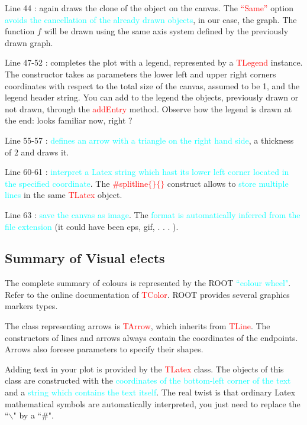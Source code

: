 \documentclass[12pt,a4paper]{article}
\begin{document}
Line 44 : again draws the clone of the object on the canvas. The \textcolor{red}{``Same”} option \textcolor{cyan}{avoids the cancellation of the already drawn objects}, in our case, the graph. The function $f$ will be drawn using the same axis system defined by the previously drawn graph.

Line 47-52 : completes the plot with a legend, represented by a \textcolor{red}{TLegend} instance. The constructor takes as parameters the lower left and upper right corners coordinates with respect to the total size of the canvas, assumed to be 1, and the legend header string. You can add to the legend the objects, previously drawn or not drawn, through the \textcolor{red}{addEntry} method. Observe how the legend is drawn at the end: looks familiar now, right ?

Line 55-57 : \textcolor{cyan}{defines an arrow with a triangle on the right hand side}, a thickness of $2$ and draws it.

Line 60-61 : \textcolor{cyan}{interpret a Latex string which hast its lower left corner located in the specified coordinate}. The \textcolor{red}{$\#$splitline$\{\}\{\}$} construct allows to \textcolor{cyan}{store multiple lines} in the same \textcolor{red}{TLatex} object.

Line 63 : \textcolor{cyan}{save the canvas as image}. The \textcolor{cyan}{format is automatically inferred from the file extension} (it could have been eps, gif, . . . ).


\subsection{Summary of Visual e!ects}
The complete summary of colours is represented by the ROOT \textcolor{cyan}{``colour wheel"}. Refer to the online documentation of \textcolor{red}{TColor}. ROOT provides several graphics markers types.

The class representing arrows is \textcolor{red}{TArrow}, which inherits from \textcolor{red}{TLine}. The constructors of lines and arrows always contain the coordinates of the endpoints. Arrows also foresee parameters to specify their shapes.

Adding text in your plot is provided by the \textcolor{red}{TLatex} class. The objects of this class are constructed with the \textcolor{cyan}{coordinates of the bottom-left corner of the text} and a \textcolor{cyan}{string which contains the text itself}. The real twist is that ordinary Latex mathematical symbols are automatically interpreted, you just need to replace the ``$\backslash$" by a ``$\#$".
\end{document}
